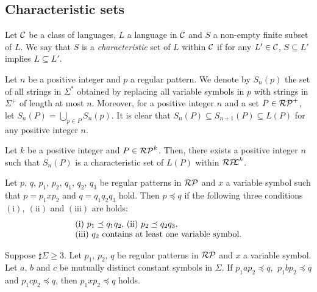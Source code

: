 \subsection{Characteristic sets}\label{subsec:charsets}

\begin{dfn}
    Let $\mathcal{C}$ be a class of languages, $L$ a language in $\mathcal{C}$ and
    $S$ a non-empty finite subset of $L$.
    We say that $S$ is a \textit{characteristic} set of $L$ within $\mathcal{C}$
    if for any $L' \in \mathcal{C}$,
    $S \subseteq L'$ implies $L \subseteq L'$.
\end{dfn}

Let $n$ be a positive integer and $p$ a regular pattern. 
We denote by $S_{n}(p)$ the set of all strings in $\Sigma^{\ast}$ obtained by replacing all variable symbols in $p$
with strings in $\Sigma^{+}$ of length at most $n$.
Moreover, for a positive integer $n$ and a set $P \in \mathcal{RP}^{+}$, 
let $S_{n}(P)=\bigcup_{p \in P}S_{n}(p)$.
It is clear that $S_{n}(P) \subseteq S_{n+1}(P) \subseteq L(P)$ for any positive integer $n$.

\begin{thm}
    Let $k$ be a positive integer and $P \in \mathcal{RP}^{k}$.
    Then, there exists a positive integer $n$ such that $S_{n}(P)$ is a characteristic set of $L(P)$ within $\mathcal{RP\!\!L}^{k}$.
\end{thm}

\begin{thm}\label{Sato1:Lemma9}
    Let $p$, $q$, $p_{1}$, $p_{2}$, $q_{1}$, $q_{2}$, $q_{3}$ be regular patterns in $\mathcal{RP}$ and $x$ a variable symbol such that 
    $p = p_{1}xp_{2}$ and $q = q_{1}q_{2}q_{3}$ hold.
    Then $p \preceq q$ if the following three conditions $(\mathrm{i}),~(\mathrm{ii})$ and $(\mathrm{iii})$ are holds:
    \[
        \begin{tabular}{ll}
            $(\mathrm{i})$ $p_{1} \preceq q_{1}q_{2},$
            $(\mathrm{ii})$ $p_{2} \preceq q_{2}q_{3},$ \\
            $(\mathrm{iii})$ $q_{2}$ contains at least one variable symbol.
        \end{tabular}
    \]
\end{thm}

\begin{lem}\label{Sato1:Lemma10}
    Suppose $\sharp \Sigma \geq 3$.
    Let $p_{1}$, $p_{2}$, $q$ be regular patterns in $\mathcal{RP}$ and $x$ a variable symbol. 
    Let $a$, $b$ and $c$ be mutually distinct constant symbols in $\Sigma$.
    If $p_{1}ap_{2} \preceq q$, $\ p_{1}bp_{2} \preceq q$ and $p_{1}cp_{2} \preceq q$, then $ p_{1}xp_{2}\preceq q$ holds.
\end{lem}

